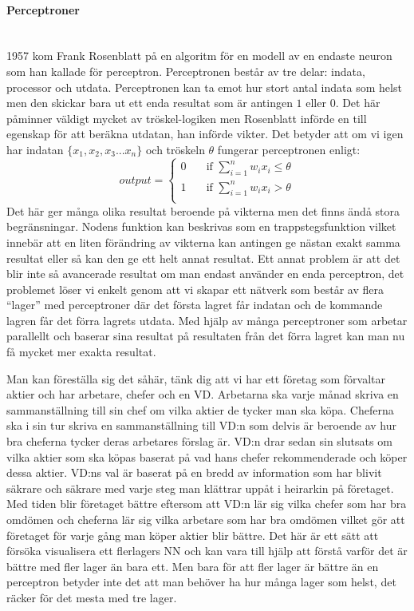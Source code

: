 \documentclass[a4paper,10pt]{article}
\begin{document}
\paragraph{Perceptroner}\hspace{0pt}\\
1957 kom Frank Rosenblatt \autocite{NNperceptron} på en algoritm för en modell av en endaste neuron som han kallade för perceptron. Perceptronen består av tre delar: indata, processor och utdata\autocite{TNC}. Perceptronen kan ta emot hur stort antal indata som helst men den skickar bara ut ett enda resultat som är antingen $1$ eller $0$. Det här påminner väldigt mycket av tröskel-logiken men Rosenblatt införde en till egenskap för att beräkna utdatan, han införde vikter. Det betyder att om vi igen har indatan 
$ \{ x_1,x_2,x_3...x_n \} $ och tröskeln $\theta$ fungerar perceptronen enligt\autocite{NNDL}:
\[output=\begin{cases}
    0  & \quad \text{if } \sum_{i=1}^{n} {w_ix_i} \leq \theta \\
    1  & \quad \text{if } \sum_{i=1}^{n} {w_ix_i} > \theta\\
  \end{cases}
\]
Det här ger många olika resultat beroende på vikterna men det finns ändå stora begränsningar. Nodens funktion kan beskrivas som en trappstegsfunktion vilket innebär att en liten förändring av vikterna kan antingen ge nästan exakt samma resultat eller så kan den ge ett helt annat resultat. Ett annat problem är att det blir inte så avancerade resultat om man endast använder en enda perceptron, det problemet löser vi enkelt genom att vi skapar ett nätverk som består av flera ``lager'' med perceptroner där det första lagret får indatan och de kommande lagren får det förra lagrets utdata. Med hjälp av många perceptroner som arbetar parallellt och baserar sina resultat på resultaten från det förra lagret kan man nu få mycket mer exakta resultat.\\\par 

Man kan föreställa sig det såhär, tänk dig att vi har ett företag som förvaltar aktier och har arbetare, chefer och en VD. Arbetarna ska varje månad skriva en sammanställning till sin chef om vilka aktier de tycker man ska köpa. Cheferna ska i sin tur skriva en sammanställning till VD:n som delvis är beroende av hur bra cheferna tycker deras arbetares förslag är. VD:n drar sedan sin slutsats om vilka aktier som ska köpas baserat på vad hans chefer rekommenderade och köper dessa aktier. VD:ns val är baserat på en bredd av information som har blivit säkrare och säkrare med varje steg man klättrar uppåt i heirarkin på företaget. Med tiden blir företaget bättre eftersom att VD:n lär sig vilka chefer som har bra omdömen och cheferna lär sig vilka arbetare som har bra omdömen vilket gör att företaget för varje gång man köper aktier blir bättre. Det här är ett sätt att försöka visualisera ett flerlagers NN och kan vara till hjälp att förstå varför det är bättre med fler lager än bara ett. Men bara för att fler lager är bättre än en perceptron betyder inte det att man behöver ha hur många lager som helst, det räcker för det mesta med tre lager.
\end{document}
